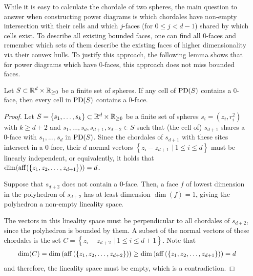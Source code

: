 While it is easy to calculate the chordale of two spheres, the main question to answer when constructing power diagrams is which chordales have non-empty intersection with their cells and which $j$-faces (for $0 \leq j < d - 1$) shared by which cells exist.
To describe all existing bounded faces, one can find all $0$-faces and remember which sets of them describe the existing faces of higher dimensionality via their convex hulls.
To justify this approach, the following lemma shows that for power diagrams which have $0$-faces, this approach does not miss bounded faces.

\begin{lemma}
    \label{lem:zerofaces}
    Let $S \subset \mathbb{R}^d \times \mathbb{R}_{\geq 0}$ be a finite set of spheres.
    If any cell of $\operatorname{PD}(S)$ contains a $0$-face, then every cell in $\operatorname{PD}(S)$ contains a $0$-face.
\end{lemma}
\begin{proof}
    Let $S = \left\{ s_1, \dots, s_k \right\} \subset \mathbb{R}^d \times \mathbb{R}_{\geq 0}$ be a finite set of spheres $s_i = (z_i, r_i^2)$ with $k \geq d+2$ and $s_1, \dots, s_d, s_{d+1}, s_{d+2} \in S$ such that (the cell of) $s_{d+1}$ shares a $0$-face with $s_1, \dots, s_d$ in $\operatorname{PD}(S)$.
    Since the chordales of $s_{d+1}$ with these sites intersect in a $0$-face, their $d$ normal vectors $\left\{  z_i - z_{d+1} \mid 1 \leq i \leq d\right\}$ must be linearly independent, or equivalently, it holds that $\dim(\operatorname{aff}(\left\{ z_1, z_2, \dots, z_{d+1} \right\})) = d$.

    Suppose that $s_{d+2}$ does not contain a $0$-face.
    Then, a face $f$ of lowest dimension in the polyhedron of $s_{d+2}$ has at least dimension $\dim(f) = 1$, giving the polyhedron a non-empty lineality space.

    The vectors in this lineality space must be perpendicular to all chordales of $s_{d+2}$, since the polyhedron is bounded by them.
    A subset of the normal vectors of these chordales is the set $C = \left\{ z_i - z_{d+2} \mid 1 \leq i \leq d+1 \right\}$.
    Note that
    \begin{align}
        \dim(C) = \dim \left( \operatorname{aff} \left( \left\{ z_1, z_2, \dots, z_{d+2} \right\} \right) \right) \geq \dim \left( \operatorname{aff} \left( \left\{ z_1, z_2, \dots, z_{d+1} \right\} \right) \right) = d
    \end{align}
    and therefore, the lineality space must be empty, which is a contradiction.
\end{proof}

